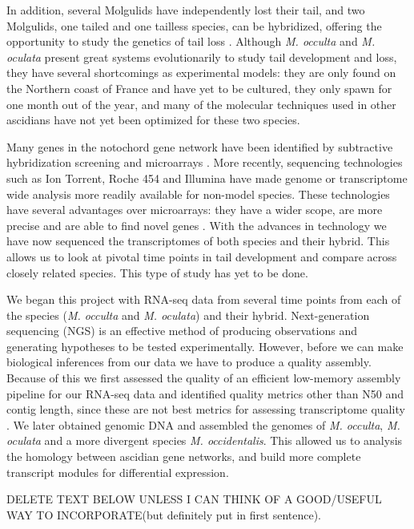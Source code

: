 In addition, several Molgulids have independently lost their tail, and two Molgulids, one tailed and one tailless species, can be hybridized, offering the opportunity to study the genetics of tail loss \cite{jeffery_evolutionary_1991}. Although \textit{M. occulta} and \textit{M. oculata} present great systems evolutionarily to study tail development and loss, they have several shortcomings as experimental models: they are only found on the Northern coast of France and have yet to be cultured, they only spawn for one month out of the year, and many of the molecular techniques used in other ascidians have not yet been optimized for these two species.

Many genes in the notochord gene network have been identified by subtractive hybridization screening and microarrays \cite{jeffery_factors_1992,hotta_characterization_2000,gyoja_analysis_2007,kobayashi_differential_2013}. More recently, sequencing technologies such as Ion Torrent, Roche 454 and Illumina have made genome or transcriptome wide analysis more readily available for non-model species. These technologies have several advantages over microarrays: they have a wider scope, are more precise and are able to find novel genes \cite{marioni_rna-seq:_2008}. With the advances in technology we have now sequenced the transcriptomes of both species and their hybrid. This allows us to look at pivotal time points in tail development and compare across closely related species. This type of study has yet to be done. 

We began this project with RNA-seq data from several time points from each of the species (\textit{M. occulta} and \textit{M. oculata}) and their hybrid. Next-generation sequencing (NGS) is an effective method of producing observations and generating hypotheses to be tested experimentally. However, before we can make biological inferences from our data we have to produce a quality assembly. Because of this we first assessed the quality of an efficient low-memory assembly pipeline for our RNA-seq data and identified quality metrics other than N50 and contig length, since these are not best metrics for assessing transcriptome quality \cite{oneil_assessing_2013}. We later obtained genomic DNA and assembled the genomes of \textit{M. occulta}, \textit{M. oculata} and a more divergent species \textit{M. occidentalis}. This allowed us to analysis the homology between ascidian gene networks, and build more complete transcript modules for differential expression\cite{vijay_challenges_2012}.

DELETE TEXT BELOW UNLESS I CAN THINK OF A GOOD/USEFUL WAY TO INCORPORATE(but definitely put in first  sentence). 

